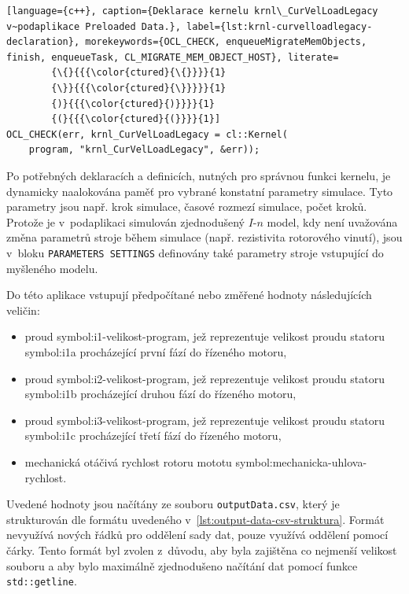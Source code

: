 \documentclass[a4paper, twoside, 11pt]{article}
\begin{document}
	   \begin{lstlisting}[language={c++}, caption={Deklarace kernelu krnl\_CurVelLoadLegacy v~podaplikace Preloaded Data.}, label={lst:krnl-curvelloadlegacy-declaration}, morekeywords={OCL_CHECK, enqueueMigrateMemObjects, finish, enqueueTask, CL_MIGRATE_MEM_OBJECT_HOST}, literate=
		{\{}{{{\color{ctured}{\{}}}}{1}
		{\}}{{{\color{ctured}{\}}}}}{1}
		{)}{{{\color{ctured}{)}}}}{1}
		{(}{{{\color{ctured}{(}}}}{1}]
OCL_CHECK(err, krnl_CurVelLoadLegacy = cl::Kernel(
	program, "krnl_CurVelLoadLegacy", &err));
\end{lstlisting}
	Po potřebných deklaracích a definicích, nutných pro správnou funkci kernelu, je dynamicky naalokována paměť pro vybrané konstatní parametry simulace. Tyto parametry jsou např. krok simulace, časové rozmezí simulace, počet kroků. Protože je v~podaplikaci simulován zjednodušený $I$-$n$ model, kdy není uvažována změna parametrů stroje během simulace (např. rezistivita rotorového vinutí), jsou v~bloku \texttt{PARAMETERS SETTINGS} definovány také parametry stroje vstupující do myšleného modelu.\par
	Do této aplikace vstupují předpočítané nebo změřené hodnoty následujících veličin:
	\begin{itemize}
		\item proud \gls{symbol:i1-velikost-program}, jež reprezentuje velikost proudu statoru \gls{symbol:i1a} procházející první fází do řízeného motoru,
		\item proud \gls{symbol:i2-velikost-program}, jež reprezentuje velikost proudu statoru \gls{symbol:i1b} procházející druhou fází do řízeného motoru,
		\item proud \gls{symbol:i3-velikost-program}, jež reprezentuje velikost proudu statoru \gls{symbol:i1c} procházející třetí fází do řízeného motoru,
		\item mechanická otáčivá rychlost rotoru mototu \gls{symbol:mechanicka-uhlova-rychlost}.
	\end{itemize}
	Uvedené hodnoty jsou načítány ze souboru \texttt{outputData.csv}, který je strukturován dle formátu uvedeného v~\ref{lst:output-data-csv-struktura}. Formát nevyužívá nových řádků pro oddělení sady dat, pouze využívá oddělení pomocí čárky. Tento formát byl zvolen z~důvodu, aby byla zajištěna co nejmenší velikost souboru a aby bylo maximálně zjednodušeno načítání dat pomocí funkce \texttt{std::getline}.\par
\end{document}
